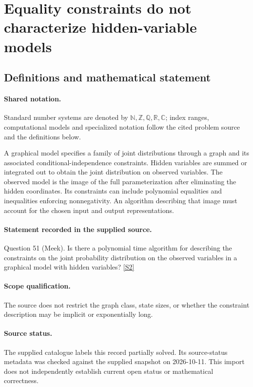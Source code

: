 \documentclass[11pt]{article}
\newcommand{\sref}[2]{\hyperlink{source:#1:#2}{[S#2]}}
\begin{document}
\section{Equality constraints do not characterize hidden-variable models}\label{statement}

\subsection{Definitions and mathematical statement}

\paragraph{Shared notation.}Standard number systems are denoted by $\mathbb N,\mathbb Z,\mathbb Q,\mathbb R,\mathbb C$; index ranges, computational models and specialized notation follow the cited problem source and the definitions below.


A graphical model specifies a family of joint distributions through a graph and its associated conditional-independence constraints. Hidden variables are summed or integrated out to obtain the joint distribution on observed variables. The observed model is the image of the full parameterization after eliminating the hidden coordinates. Its constraints can include polynomial equalities and inequalities enforcing nonnegativity. An algorithm describing that image must account for the chosen input and output representations.
\paragraph{Statement recorded in the supplied source.}
Question 51 (Meek). Is there a polynomial time algorithm for describing the constraints on the joint probability distribution on the observed variables in a graphical model with hidden variables? \sref{statement}{2}
\paragraph{Scope qualification.}
The source does not restrict the graph class, state sizes, or whether the constraint description may be implicit or exponentially long.
\paragraph{Source status.}
The supplied catalogue labels this record partially solved. Its source-status metadata was checked against the supplied snapshot on 2026-10-11. This import does not independently establish current open status or mathematical correctness.
\end{document}
